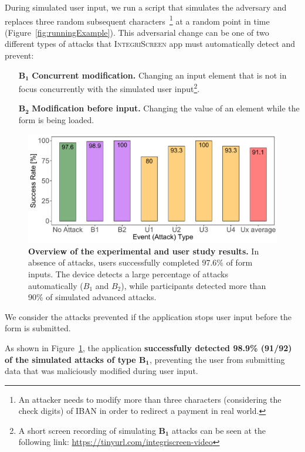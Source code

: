 \documentclass[sigconf, anonymous, balance=false]{acmart}
\newcommand{\myparagraph}[1]{\myparagraphnodot{#1.}}
\newcommand{\myparagraphnodot}[1]{\vspace{4pt} \noindent {\bfseries #1}\xspace}
\newcommand{\B}[1]{$\mathbf{B_#1}$\xspace}
\newcommand{\sysname}{\textsc{IntegriScreen}\xspace}
\begin{document}
During simulated user input, we run a script that simulates the adversary and replaces three random subsequent characters~\footnote{An attacker needs to modify more than three characters (considering the check digits) of IBAN in order to redirect a payment in real world.} at a random point in time (Figure~\ref{fig:runningExample}).
This adversarial change can be one of two different types of attacks that \sysname app must automatically detect and prevent:
\begin{enumerate}[leftmargin=*]
	\item[\B{1}] \textbf{Concurrent modification.} Changing an input element that is not in focus concurrently with the simulated user input\footnote{
A short screen recording of simulating \B{1} attacks can be seen at the following link:
\url{https://tinyurl.com/integriscreen-video}}.
\item[\B{2}] \textbf{Modification before input.} Changing the value of an element while the form is being loaded.
\end{enumerate}


\begin{figure}[t]
	\centering
	\hspace*{-10mm}
	\includegraphics[width=1\columnwidth]{img/successRates.pdf}
	\caption{
		\textbf{Overview of the experimental and user study results.}
        In absence of attacks, users successfully completed 97.6\% of form inputs.
        The device detects a large percentage of attacks automatically ($B_1$ and $B_2$), while participants detected more than 90\% of simulated advanced attacks.
	} \label{fig:resultsOverview}
\end{figure}


We consider the attacks prevented if the application stops user input before the form is submitted.


\myparagraph{Results}
As shown in Figure~\ref{fig:resultsOverview}, the application \textbf{successfully detected 98.9\% (91/92) of the simulated attacks of type \B{1}}, preventing the user from submitting data that was maliciously modified during user input.
\end{document}

